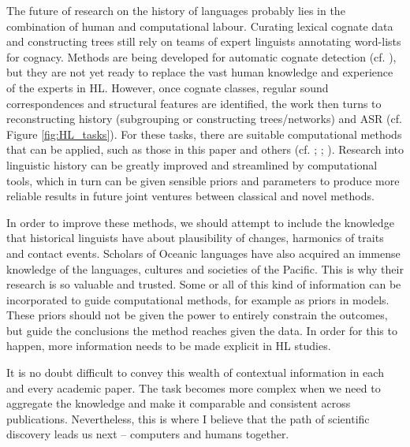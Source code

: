 \documentclass[12pt,letterpaper]{article}
\begin{document}


The future of research on the history of languages probably lies in the combination of human and computational labour. Curating lexical cognate data \citep{list2022lexibank} and constructing trees \citep{grayetal_2009} still rely on teams of expert linguists annotating word-lists for cognacy. Methods are being developed for automatic cognate detection (cf. \citealt{list2017potential}), but they are not yet ready to replace the vast human knowledge and experience of the experts in HL. However, once cognate classes, regular sound correspondences and structural features are identified, the work then turns to reconstructing history (subgrouping or constructing trees/networks) and ASR (cf. Figure \ref{fig:HL_tasks}). For these tasks, there are suitable computational methods that can be applied, such as those in this paper and others (cf. \citealt{greenhill2015evolution}; \citealt{gray_greenhill_defend_bayes}; \citealt{joy2016ancestral}). Research into linguistic history can be greatly improved and streamlined by computational tools, which in turn can be given sensible priors and parameters to produce more reliable results in future joint ventures between classical and novel methods.

In order to improve these methods, we should attempt to include the knowledge that historical linguists have about plausibility of changes, harmonics of traits and contact events. Scholars of Oceanic languages have also acquired an immense knowledge of the languages, cultures and societies of the Pacific. This is why their research is so valuable and trusted. Some or all of this kind of information can be incorporated to guide computational methods, for example as priors in models. These priors should not be given the power to entirely constrain the outcomes, but guide the conclusions the method reaches given the data. In order for this to happen, more information needs to be made explicit in HL studies.

It is no doubt difficult to convey this wealth of contextual information in each and every academic paper. The task becomes more complex when we need to aggregate the knowledge and make it comparable and consistent across publications. Nevertheless, this is where I believe that the path of scientific discovery leads us next -- computers and humans together.
\end{document}
